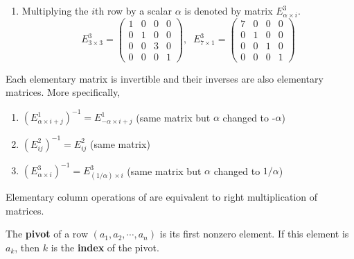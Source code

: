 \begin{definition}
\begin{enumerate}
      \item Multiplying the $i$th row by a scalar $\alpha$ is denoted by matrix $E^3_{\alpha \times i}$. 
      \begin{equation}
        E^3_{3 \times 3} = \begin{pmatrix}
        1&0&0&0 \\ 0&1&0&0 \\ 0&0&3&0 \\ 0&0&0&1
        \end{pmatrix}, \;\; E^3_{7 \times 1} = \begin{pmatrix}
        7&0&0&0 \\ 0&1&0&0 \\ 0&0&1&0 \\ 0&0&0&1
        \end{pmatrix}
      \end{equation}
    \end{enumerate}
  \end{definition}


  \begin{theorem}
    Each elementary matrix is invertible and their inverses are also elementary matrices. More specifically, 
    \begin{enumerate}
      \item $(E^1_{\alpha \times i + j})^{-1} = E^1_{-\alpha \times i + j}$ (same matrix but $\alpha$ changed to -$\alpha$)
      \item $(E^2_{i j})^{-1} = E^2_{i j}$ (same matrix) 
      \item $(E^3_{\alpha \times i})^{-1} = E^{3}_{(1/\alpha) \times i}$ (same matrix but $\alpha$ changed to $1 / \alpha$)
    \end{enumerate}
  \end{theorem}

  Elementary column operations of are equivalent to right multiplication of matrices. 

  \begin{definition}[Pivot]
    The \textbf{pivot} of a row $(a_1, a_2, \cdots, a_n)$ is its first nonzero element. If this element is $a_k$, then $k$ is the \textbf{index} of the pivot. 
  \end{definition}

